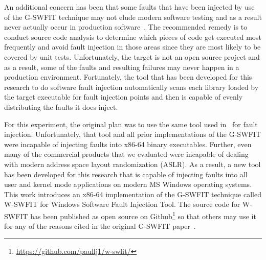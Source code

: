 An additional concern has been that some faults that have been injected by use
of the G-SWFIT technique may not elude modern software testing and as a result
never actually occur in production software~\cite{natella2010}.  The
recommended remedy is to conduct source code analysis to determine which
pieces of code get executed most frequently and avoid fault injection in those
areas since they are most likely to be covered by unit tests.  Unfortunately,
the target is not an open source project and as a result, some of the faults
and resulting failures may never happen in a production environment.
Fortunately, the tool that has been developed for this research to do software
fault injection automatically scans each library loaded by the target
executable for fault injection points and then is capable of evenly
distributing the faults it does inject.

For this experiment, the original plan was to use the same tool used
in~\cite{irrera2015} for fault injection.  Unfortunately, that tool and all
prior implementations of the G-SWFIT were incapable of injecting faults into
x86-64 binary executables.  Further, even many of the commercial products that
we evaluated were incapable of dealing with modern address space layout
randomization (ASLR).  As a result, a new tool has been developed for this
research that is capable of injecting faults into all user and kernel mode
applications on modern MS Windows operating systems.  This work introduces an
x86-64 implementation of the G-SWFIT technique called W-SWFIT for Windows
Software Fault Injection Tool.  The source code for W-SWFIT has been published
as open source on Github\footnote{\url{https://github.com/paullj1/w-swfit/}}
so that others may use it for any of the reasons cited in the original G-SWFIT
paper~\cite{gswfit}.

